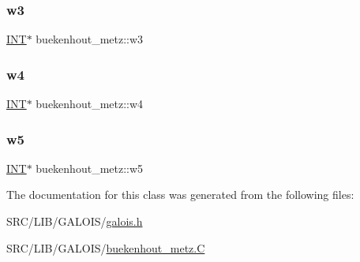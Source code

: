 \mbox{\label{classbuekenhout__metz_a3f86ec66b929323c7062ac13934a8b05}} 
\subsubsection{\texorpdfstring{w3}{w3}}
{\footnotesize\ttfamily \mbox{\hyperlink{galois_8h_a09fddde158a3a20bd2dcadb609de11dc}{I\+NT}}$\ast$ buekenhout\+\_\+metz\+::w3}

\mbox{\label{classbuekenhout__metz_acac0799fdd51f3f8a46ccc804b4fec04}} 
\subsubsection{\texorpdfstring{w4}{w4}}
{\footnotesize\ttfamily \mbox{\hyperlink{galois_8h_a09fddde158a3a20bd2dcadb609de11dc}{I\+NT}}$\ast$ buekenhout\+\_\+metz\+::w4}

\mbox{\label{classbuekenhout__metz_a84e4e0c09e2f2668af1759f142b90691}} 
\subsubsection{\texorpdfstring{w5}{w5}}
{\footnotesize\ttfamily \mbox{\hyperlink{galois_8h_a09fddde158a3a20bd2dcadb609de11dc}{I\+NT}}$\ast$ buekenhout\+\_\+metz\+::w5}



The documentation for this class was generated from the following files\+:\begin{DoxyCompactItemize}
\item 
S\+R\+C/\+L\+I\+B/\+G\+A\+L\+O\+I\+S/\mbox{\hyperlink{galois_8h}{galois.\+h}}\item 
S\+R\+C/\+L\+I\+B/\+G\+A\+L\+O\+I\+S/\mbox{\hyperlink{buekenhout__metz_8_c}{buekenhout\+\_\+metz.\+C}}\end{DoxyCompactItemize}

